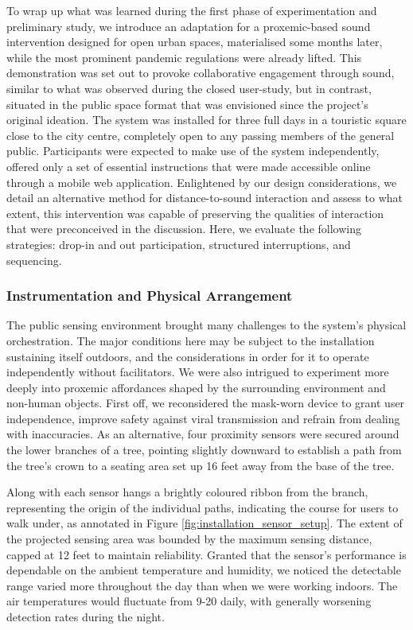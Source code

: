 To wrap up what was learned during the first phase of experimentation and preliminary study, we introduce an adaptation for a proxemic-based sound intervention designed for open urban spaces, materialised some months later, while the most prominent pandemic regulations were already lifted. This demonstration was set out to provoke collaborative engagement through sound, similar to what was observed during the closed user-study, but in contrast, situated in the public space format that was envisioned since the project's original ideation. The system was installed for three full days in a touristic square close to the city centre, completely open to any passing members of the general public. Participants were expected to make use of the system independently, offered only a set of essential instructions that were made accessible online through a mobile web application. Enlightened by our design considerations, we detail an alternative method for distance-to-sound interaction and assess to what extent, this intervention was capable of preserving the qualities of interaction that were preconceived in the discussion. Here, we evaluate the following strategies: drop-in and out participation, structured interruptions, and sequencing.

\subsubsection{Instrumentation and Physical Arrangement}

The public sensing environment brought many challenges to the system's physical orchestration. The major conditions here may be subject to the installation sustaining itself outdoors, and the considerations in order for it to operate independently without facilitators. We were also intrigued to experiment more deeply into proxemic affordances shaped by the surrounding environment and non-human objects. First off, we reconsidered the mask-worn device to grant user independence, improve safety against viral transmission and refrain from dealing with inaccuracies. As an alternative, four proximity sensors were secured around the lower branches of a tree, pointing slightly downward to establish a path from the tree's crown to a seating area set up 16 feet away from the base of the tree. 

Along with each sensor hangs a brightly coloured ribbon from the branch, representing the origin of the individual paths, indicating the course for users to walk under, as annotated in Figure \ref{fig:installation_sensor_setup}. The extent of the projected sensing area was bounded by the maximum sensing distance, capped at 12 feet to maintain reliability. Granted that the sensor's performance is dependable on the ambient temperature and humidity, we noticed the detectable range varied more throughout the day than when we were working indoors. The air temperatures would fluctuate from 9-20 \celsius  daily, with generally worsening detection rates during the night. 

